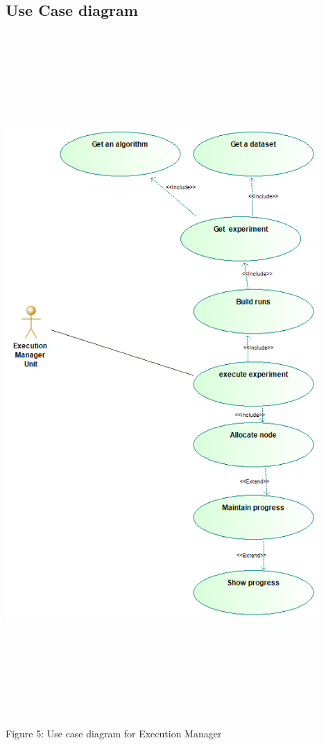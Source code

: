 \subsection{Use Case diagram}
    \includegraphics[width=12cm,height=26cm,keepaspectratio]{execution_manager/images/execution_manager_use_case_diagram.png}
    \begin{center}
    	\small{Figure 5: Use case diagram for Execution Manager}
    \end{center}